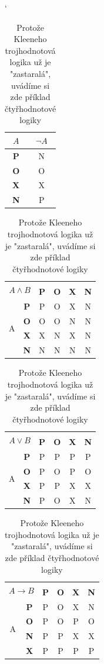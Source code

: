 \documentclass[11pt,a4paper,onecolumn]{article}
\begin{document}
\begin{table}[ht]

\begin{center}
\catcode`
\begin{tabular}[p]{|>{\bfseries}c|c|}\hline

$A$ & $\neg A$ \\\hline
P & N \\\hline
O & O \\\hline
X & X \\\hline
N & P \\\hline
\end{tabular}
\begin{tabular}[p]{|c|>{\bfseries}c|c|c|c|c|}\hline
\multicolumn{2}{|c|}{\multirow{2}{*}{$A \wedge B$}} & \multicolumn{4}{c|}{$B$} \\\cline{3-6}
\multicolumn{2}{|c|}{} & \textbf{P} & \textbf{O} & \textbf{X} & \textbf{N}  \\\hline
\multirow{4}{*}{A} 
  & P & P & O & X & N\\\cline{2-6}
  & O & O & O & N & N\\\cline{2-6}
  & X & X & N & X & N\\\cline{2-6}
  & N & N & N & N & N\\\hline
\end{tabular}
\begin{tabular}[p]{|c|>{\bfseries}c|c|c|c|c|}\hline
\multicolumn{2}{|c|}{\multirow{2}{*}{$A \vee B$}} & \multicolumn{4}{c|}{$B$} \\\cline{3-6}
\multicolumn{2}{|c|}{} & \textbf{P} & \textbf{O} & \textbf{X} & \textbf{N}  \\\hline
\multirow{4}{*}{A} 
  & P & P & P & P & P\\\cline{2-6}
  & O & P & O & P & O\\\cline{2-6}
  & X & P & P & X & X\\\cline{2-6}
  & N & P & O & X & N\\\hline
\end{tabular}
\begin{tabular}[p]{|c|>{\bfseries}c|c|c|c|c|}\hline
\multicolumn{2}{|c|}{\multirow{2}{*}{$A \rightarrow B$}} & \multicolumn{4}{c|}{$B$} \\\cline{3-6}
\multicolumn{2}{|c|}{} & \textbf{P} & \textbf{O} & \textbf{X} & \textbf{N}  \\\hline
\multirow{4}{*}{A} 
  & P & P & O & X & N\\\cline{2-6}
  & O & P & O & P & O\\\cline{2-6}
  & N & P & P & X & X\\\cline{2-6}
  & X & P & P & P & P\\\hline
\end{tabular}
\caption{Protože Kleeneho trojhodnotová logika už je "zastaralá", uvádíme si zde příklad čtyřhodnotové logiky}
\label{tab2}
\end{center}
\end{table}
\end{document}
